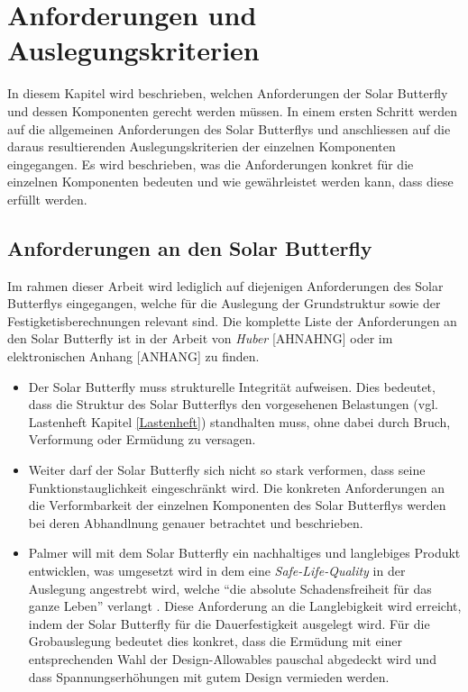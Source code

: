 \section{Anforderungen und Auslegungskriterien}
In diesem Kapitel wird beschrieben, welchen Anforderungen der Solar Butterfly und dessen Komponenten gerecht werden müssen. In einem ersten Schritt werden auf die allgemeinen Anforderungen des Solar Butterflys und anschliessen auf die daraus resultierenden Auslegungskriterien der einzelnen Komponenten eingegangen. Es wird beschrieben, was die Anforderungen konkret für die einzelnen Komponenten bedeuten und wie gewährleistet werden kann, dass diese erfüllt werden.\\


\subsection{Anforderungen an den Solar Butterfly}
Im rahmen dieser Arbeit wird lediglich auf diejenigen Anforderungen des Solar Butterflys eingegangen, welche für die Auslegung der Grundstruktur sowie der Festigketisberechnungen relevant sind. Die komplette Liste der Anforderungen an den Solar Butterfly ist in der Arbeit von \emph{Huber} [AHNAHNG] oder im elektronischen Anhang [ANHANG] zu finden.
\begin{itemize}
  \item Der Solar Butterfly muss strukturelle Integrität aufweisen. Dies bedeutet, dass die Struktur des Solar Butterflys den vorgesehenen Belastungen (vgl. Lastenheft Kapitel \ref{Lastenheft}) standhalten muss, ohne dabei durch Bruch, Verformung oder Ermüdung zu versagen.
  \item Weiter darf der Solar Butterfly sich nicht so stark verformen, dass seine Funktionstauglichkeit eingeschränkt wird. Die konkreten Anforderungen an die Verformbarkeit der einzelnen Komponenten des Solar Butterflys werden bei deren Abhandlnung genauer betrachtet und beschrieben.
  \item Palmer will mit dem Solar Butterfly ein nachhaltiges und langlebiges Produkt entwicklen, was umgesetzt wird in dem eine \emph{Safe-Life-Quality} in der Auslegung angestrebt wird, welche ``die absolute Schadensfreiheit für das ganze Leben'' verlangt \cite{klein}. Diese Anforderung an die Langlebigkeit wird erreicht, indem der Solar Butterfly für die Dauerfestigkeit ausgelegt wird. Für die Grobauslegung bedeutet dies konkret, dass die Ermüdung mit einer entsprechenden Wahl der Design-Allowables pauschal abgedeckt wird und dass Spannungserhöhungen mit gutem Design vermieden werden.
\end{itemize}

